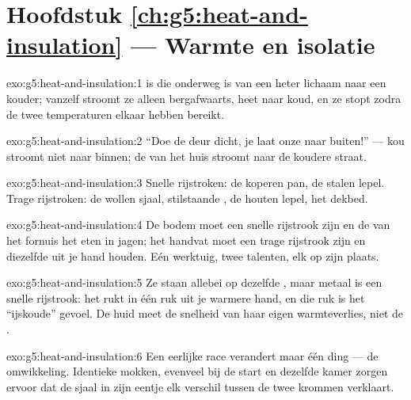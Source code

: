 \section*{Hoofdstuk \ref{ch:g5:heat-and-insulation} --- Warmte en isolatie}

\begin{solution}{exo:g5:heat-and-insulation:1}
 is  die onderweg is van een heter lichaam naar een
kouder; vanzelf stroomt ze alleen bergafwaarts, heet naar koud, en ze
stopt zodra de twee temperaturen elkaar hebben bereikt.
\end{solution}

\begin{solution}{exo:g5:heat-and-insulation:2}
``Doe de deur dicht, je laat onze  naar buiten!'' --- kou stroomt
niet naar binnen; de  van het huis stroomt naar de koudere straat.
\end{solution}

\begin{solution}{exo:g5:heat-and-insulation:3}
Snelle rijstroken: de koperen pan, de stalen lepel. Trage rijstroken:
de wollen sjaal, stilstaande , de houten lepel, het dekbed.
\end{solution}

\begin{solution}{exo:g5:heat-and-insulation:4}
De bodem moet een snelle rijstrook zijn en de  van het fornuis
het eten in jagen; het handvat moet een trage rijstrook zijn en
diezelfde  uit je hand houden. Eén werktuig, twee talenten, elk
op zijn plaats.
\end{solution}

\begin{solution}{exo:g5:heat-and-insulation:5}
Ze staan allebei op dezelfde , maar metaal is een snelle
rijstrook: het rukt  in één ruk uit je warmere hand, en die ruk
is het ``ijskoude'' gevoel. De huid meet de snelheid van haar eigen
warmteverlies, niet de .
\end{solution}

\begin{solution}{exo:g5:heat-and-insulation:6}
Een eerlijke race verandert maar één ding --- de omwikkeling.
Identieke mokken, evenveel  bij de start en dezelfde kamer zorgen
ervoor dat de sjaal in zijn eentje elk verschil tussen de twee krommen
verklaart.
\end{solution}

